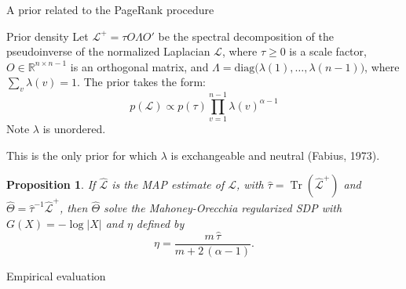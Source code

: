 \documentclass[xcolor=dvipsnames]{beamer}
\DeclareMathOperator{\Tr}{Tr}
\newtheorem{proposition}[theorem]{Proposition}
\begin{document}
\begin{frame}[c]
  \begin{block}{}
  \begin{center}
    \huge{A prior related to the PageRank procedure}
  \end{center}
  \end{block}
\end{frame}


\begin{frame}
  \begin{block}{Prior density}
    Let $\mathcal{L}^{+} = \tau O \Lambda O'$ be the spectral decomposition of
    the pseudoinverse of the normalized Laplacian $\mathcal{L}$, where
    $\tau \geq 0$ is a scale factor, $O \in \mathbb{R}^{n \times n - 1}$ is
    an orthogonal matrix, and
    $\Lambda = \mathrm{diag}\big(\lambda(1), \dotsc, \lambda(n-1)\big)$,
    where $\sum_v \lambda(v) = 1$.  The prior takes the form:
    \[
      p(\mathcal{L}) \propto p(\tau) \prod_{v=1}^{n-1} \lambda(v)^{\alpha - 1}
    \]
    Note $\lambda$ is unordered.
  \end{block}
  This is the only prior for which $\lambda$ is exchangeable and neutral
  (Fabius, 1973).
\end{frame}


\begin{frame}
  \begin{proposition}
    If $\mathcal{\hat L}$ is the MAP estimate of $\mathcal{L}$, with
    $\hat \tau = \Tr(\mathcal{\hat L}^+)$ and
    $\hat \Theta = \hat \tau^{-1} \mathcal{\hat L}^+$,
    then $\hat \Theta$ solve
    the Mahoney-Orecchia regularized SDP with $G(X) = -\log |X|$ and
    $\eta$ defined by
    \[
      \eta = \frac{m \, \hat \tau}{m + 2\,(\alpha - 1)}.
    \]
  \end{proposition}
\end{frame}

\begin{frame}[c]
  \begin{block}{}
  \begin{center}
    \huge{Empirical evaluation}
  \end{center}
  \end{block}
\end{frame}
\end{document}

